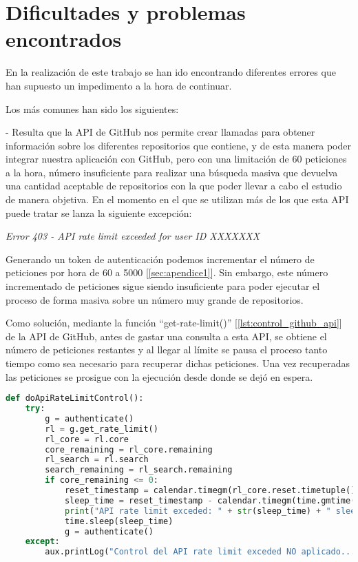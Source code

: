 \section{Dificultades y problemas encontrados}
En la realización de este trabajo se han ido encontrando diferentes errores que han supuesto un impedimento a la hora de continuar. 

Los más comunes han sido los siguientes:

- Resulta que la API de GitHub nos permite crear llamadas para obtener información sobre los diferentes repositorios que contiene, y de esta manera poder integrar nuestra aplicación con GitHub, pero con una limitación de 60 peticiones a la hora, número insuficiente para realizar una búsqueda masiva que devuelva una cantidad aceptable de repositorios con la que poder llevar a cabo el estudio de manera objetiva. En el momento en el que se utilizan más de los que esta API puede tratar se lanza la siguiente excepción: 

\textit{Error 403 - API rate limit exceeded for user ID XXXXXXX}

Generando un token de autenticación podemos incrementar el número de peticiones por hora de 60 a 5000 [\ref{sec:apendice1}]. Sin embargo, este número incrementado de peticiones sigue siendo insuficiente para poder ejecutar el proceso de forma masiva sobre un número muy grande de repositorios.

Como solución, mediante la función ``get-rate-limit()'' [\ref{lst:control_github_api}] de la API de GitHub, antes de gastar una consulta a esta API, se obtiene el número de peticiones restantes y al llegar al límite se pausa el proceso tanto tiempo como sea necesario para recuperar dichas peticiones. Una vez recuperadas las peticiones se prosigue con la ejecución desde donde se dejó en espera.

\begin{lstlisting}[language=Python, caption=Control del nº de peticiones a la API GitHub, label={lst:control_github_api}]
def doApiRateLimitControl():
    try:
        g = authenticate()
        rl = g.get_rate_limit()
        rl_core = rl.core
        core_remaining = rl_core.remaining
        rl_search = rl.search
        search_remaining = rl_search.remaining
        if core_remaining <= 0:
            reset_timestamp = calendar.timegm(rl_core.reset.timetuple())
            sleep_time = reset_timestamp - calendar.timegm(time.gmtime()) + 5
            print("API rate limit exceded: " + str(sleep_time) + " sleep_time. Waiting...")
            time.sleep(sleep_time)
            g = authenticate()
    except:
        aux.printLog("Control del API rate limit exceded NO aplicado...", logging.WARNING)
\end{lstlisting}

